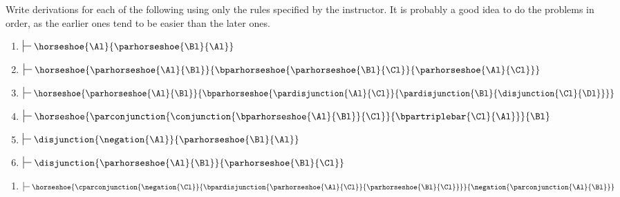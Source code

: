 Write derivations for each of the following using only the rules specified by the instructor. 
It is probably a good idea to do the problems in order, as the earlier ones tend to be easier than the later ones. 
\begin{multicols}{2}
\begin{enumerate}
\item $\sststile{}{}\horseshoe{\Al}{\parhorseshoe{\Bl}{\Al}}$
\item $\sststile{}{}\horseshoe{\parhorseshoe{\Al}{\Bl}}{\bparhorseshoe{\parhorseshoe{\Bl}{\Cl}}{\parhorseshoe{\Al}{\Cl}}}$
\item $\sststile{}{}\horseshoe{\parhorseshoe{\Al}{\Bl}}{\bparhorseshoe{\pardisjunction{\Al}{\Cl}}{\pardisjunction{\Bl}{\disjunction{\Cl}{\Dl}}}}$
\item $\sststile{}{}\horseshoe{\parconjunction{\conjunction{\bparhorseshoe{\Al}{\Bl}}{\Cl}}{\bpartriplebar{\Cl}{\Al}}}{\Bl}$
\item $\sststile{}{}\disjunction{\negation{\Al}}{\parhorseshoe{\Bl}{\Al}}$
\item $\sststile{}{}\disjunction{\parhorseshoe{\Al}{\Bl}}{\parhorseshoe{\Bl}{\Cl}}$
\end{enumerate}
\end{multicols}
\begin{enumerate}[start=7]
\item $\sststile{}{}\horseshoe{\cparconjunction{\negation{\Cl}}{\bpardisjunction{\parhorseshoe{\Al}{\Cl}}{\parhorseshoe{\Bl}{\Cl}}}}{\negation{\parconjunction{\Al}{\Bl}}}$
\end{enumerate}

